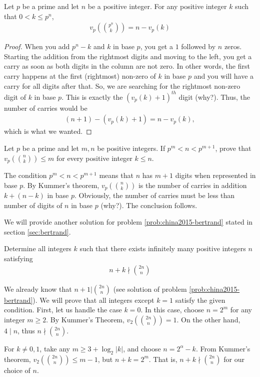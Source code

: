 \documentclass{subfile}
\begin{document}
\begin{corollary}\label{cor:kummer-corollary}
	Let $p$ be a prime and let $n$ be a positive integer. For any positive integer $k$ such that $0<k\leq p^n$,
	\begin{align*}
		v_p\left( \binom{p^n}{k}\right)	= n - v_p(k)
	\end{align*}
\end{corollary}

\begin{proof}
	When you add $p^n - k$ and $k$ in base $p$, you get a $1$ followed by $n$ zeros. Starting the addition from the rightmost digits and moving to the left, you get a carry as soon as both digits in the column are not zero. In other words, the first carry happens at the first (rightmost) non-zero of $k$ in base $p$ and you will have a carry for all digits after that. So, we are searching for the rightmost non-zero digit of $k$ in base $p$. This is exactly the $(v_p(k)+1)^{th}$ digit (why?). Thus, the number of carries would be
	\begin{align*}
		(n+1)-(v_p(k)+1) = n-v_p(k),
	\end{align*}
	which is what we wanted.
\end{proof}
\begin{problem}
	Let $p$ be a prime and let $m,n$ be positive integers. If $p^m < n < p^{m+1}$, prove that $v_p\left(\binom{n}{k}\right) \leq m$ for every positive integer $k\leq n$.
\end{problem}

\begin{solution}
	The condition $p^m < n < p^{m+1}$ means that $n$ has $m+1$ digits when represented in base $p$. By Kummer's theorem, $v_p\left(\binom{n}{k}\right)$ is the number of carries in addition $k+(n-k)$ in base $p$. Obviously, the number of carries must be less than number of digits of $n$ in base $p$ (why?). The conclusion follows.
\end{solution}
We will provide another solution for problem \ref{prob:china2015-bertrand} stated in section \ref{sec:bertrand}.

\begin{problem}[China 2015]
	Determine all integers $k$ such that there exists infinitely many positive integers $n$ satisfying
	\begin{align*}
		n+k \nmid \binom{2n}{n}
	\end{align*}
\end{problem}

\begin{solution}
	We already know that $n+1 \big| \binom{2n}{n}$ (see solution of problem \ref{prob:china2015-bertrand}). We will prove that all integers except $k=1$ satisfy the given condition. First, let us handle the case $k=0$. In this case, choose $n=2^m$ for any integer $m\geq 2$. By Kummer's Theorem, $v_2\left(\binom{2n}{n}\right)=1$. On the other hand, $4\mid n$, thus $	n \nmid\binom{2n}{n}$.

	For $k \ne 0,1$, take any $m \geq 3 + {\log _2}\left| k \right|$, and choose $n = {2^\alpha } - k$. From Kummer's theorem, $v_2\left(\binom{2n}{n}\right) \leq m - 1$, but $n + k = {2^m}$. That is, $n+k \nmid\binom{2n}{n}$ for our choice of $n$.
\end{solution}
\end{document}

